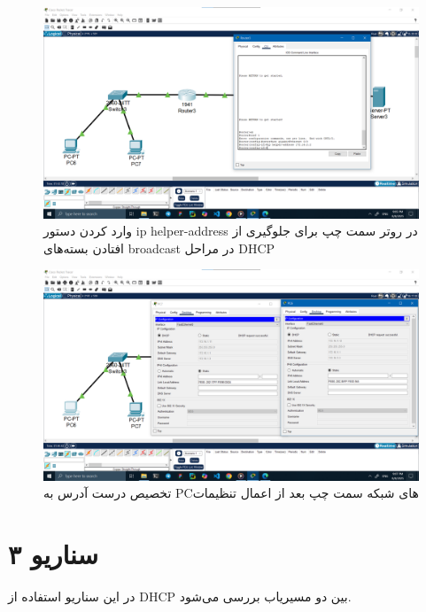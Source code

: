 \documentclass[12pt]{article}
\begin{document}
	\begin{figure}[H]
		\centering
		\includegraphics[width=\textwidth]{resources/scenario2-13.png}
		\caption{وارد کردن دستور \textenglish{ip helper-address} در روتر سمت چپ برای جلوگیری از افتادن بسته‌های \textenglish{broadcast} در مراحل \textenglish{DHCP}}
		\label{2:13}
	\end{figure}
	\begin{figure}[H]
		\centering
		\includegraphics[width=\textwidth]{resources/scenario2-14.png}
		\caption{تخصیص درست آدرس به \textenglish{PC}‌های شبکه سمت چپ بعد از اعمال تنظیمات}
		\label{2:14}
	\end{figure}
	\newpage
	\section{سناریو ۳}
	در این سناریو استفاده از \textenglish{DHCP} بین دو مسیریاب بررسی می‌شود.
	
\end{document}
